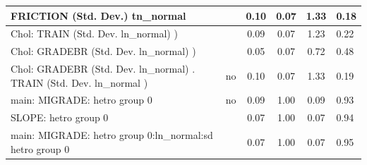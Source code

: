 \begin{table}
\begin{center}
\begin{tabular}{|l|l|c|c|c|l|}
			\hline
			FRICTION (Std. Dev.) tn_normal &  & 0.10 & 0.07 & 1.33 & 0.18 \\
			\hline
			 Chol: TRAIN (Std. Dev. ln_normal) ) &  & 0.09 & 0.07 & 1.23 & 0.22 \\
			\hline
			 Chol: GRADEBR (Std. Dev. ln_normal) ) &  & 0.05 & 0.07 & 0.72 & 0.48 \\
			\hline
			 Chol: GRADEBR (Std. Dev. ln_normal) . TRAIN (Std. Dev.   ln_normal ) & no & 0.10 & 0.07 & 1.33 & 0.19 \\
			\hline
			main: MIGRADE: hetro group 0 & no & 0.09 & 1.00 & 0.09 & 0.93 \\
			\hline
			SLOPE: hetro group 0 &  & 0.07 & 1.00 & 0.07 & 0.94 \\
			\hline
			main: MIGRADE: hetro group 0:ln_normal:sd  hetro group 0 &  & 0.07 & 1.00 & 0.07 & 0.95 \\
			\hline
		\end{tabular}
	\end{center}
\end{table}